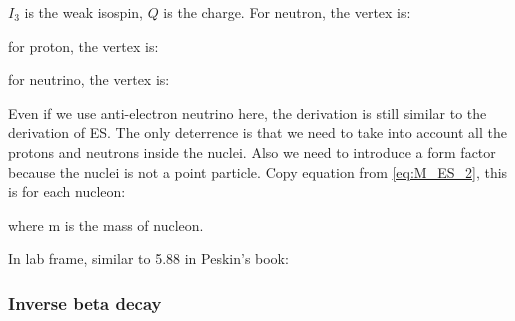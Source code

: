 $I_3$ is the weak isospin, $Q$ is the charge. For neutron, the vertex is:


for proton, the vertex is:


for neutrino, the vertex is:


Even if we use anti-electron neutrino here, the derivation is still similar to the derivation of ES.
The only deterrence is that we need to take into account all the protons and neutrons inside the nuclei.
Also we need to introduce a form factor because the nuclei is not a point particle.
Copy equation from \eqref{eq:M_ES_2}, this is for each nucleon:


where m is the mass of nucleon.

In lab frame, similar to 5.88 in Peskin's book:



\subsubsection{Inverse beta decay}

\clearpage
